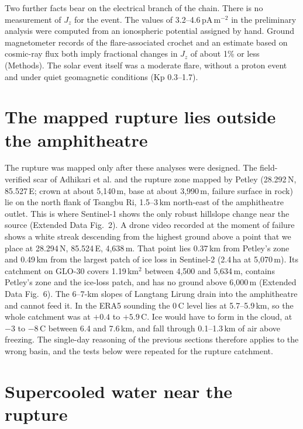 \documentclass{nature}
\newcommand{\degC}{\,\textdegree C}
\begin{document}
Two further facts bear on the electrical branch of the chain. There is no measurement of $J_z$ for the event. The values of 3.2--4.6\,pA\,m$^{-2}$ in the preliminary analysis were computed from an ionospheric potential assigned by hand. Ground magnetometer records of the flare-associated crochet and an estimate based on cosmic-ray flux both imply fractional changes in $J_z$ of about 1\% or less (Methods). The solar event itself was a moderate flare, without a proton event and under quiet geomagnetic conditions (Kp 0.3--1.7).

\section*{The mapped rupture lies outside the amphitheatre}

The rupture was mapped only after these analyses were designed. The field-verified scar of Adhikari et al.\cite{adhikari2026} and the rupture zone mapped by Petley\cite{petley2026} (28.292\textdegree\,N, 85.527\textdegree\,E; crown at about 5,140\,m, base at about 3,990\,m, failure surface in rock) lie on the north flank of Tsangbu Ri, 1.5--3\,km north-east of the amphitheatre outlet. This is where Sentinel-1 shows the only robust hillslope change near the source (Extended Data Fig.~2). A drone video recorded at the moment of failure shows a white streak descending from the highest ground above a point that we place at 28.294\textdegree\,N, 85.524\textdegree\,E, 4,638\,m. That point lies 0.37\,km from Petley's zone and 0.49\,km from the largest patch of ice loss in Sentinel-2 (2.4\,ha at 5,070\,m). Its catchment on GLO-30 covers 1.19\,km$^{2}$ between 4,500 and 5,634\,m, contains Petley's zone and the ice-loss patch, and has no ground above 6,000\,m (Extended Data Fig.~6). The 6--7-km slopes of Langtang Lirung drain into the amphitheatre and cannot feed it. In the ERA5 sounding the 0\degC{} level lies at 5.7--5.9\,km, so the whole catchment was at $+0.4$ to $+5.9$\degC{}. Ice would have to form in the cloud, at $-3$ to $-8$\degC{} between 6.4 and 7.6\,km, and fall through 0.1--1.3\,km of air above freezing. The single-day reasoning of the previous sections therefore applies to the wrong basin, and the tests below were repeated for the rupture catchment.

\section*{Supercooled water near the rupture}
\end{document}
